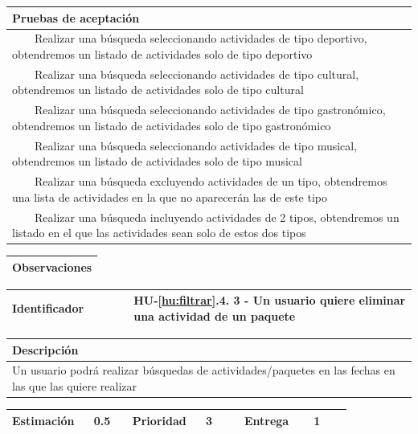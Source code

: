\documentclass[11pt]{article}
\newcommand{\tabitem}{~~\llap{\textbullet}~~}
\begin{document}
\begin{longtable}{p{1.028\linewidth}}
	\textbf{Pruebas de aceptación}\\
	\midrule
	\tabitem Realizar una búsqueda seleccionando actividades de tipo deportivo, obtendremos un listado de actividades solo de tipo deportivo\\
	\tabitem Realizar una búsqueda seleccionando actividades de tipo cultural, obtendremos un listado de actividades solo de tipo cultural\\
	\tabitem Realizar una búsqueda seleccionando actividades de tipo gastronómico, obtendremos un listado de actividades solo de tipo gastronómico\\
	\tabitem Realizar una búsqueda seleccionando actividades de tipo musical, obtendremos un listado de actividades solo de tipo musical\\
	\tabitem Realizar una búsqueda excluyendo actividades de un tipo, obtendremos una lista de actividades en la que no aparecerán las de este tipo\\
	\tabitem Realizar una búsqueda incluyendo actividades de 2 tipos, obtendremos un listado en el que las actividades sean solo de estos dos tipos\\
\end{longtable}
\begin{longtable}{p{1.028\linewidth}}
	\textbf{Observaciones}\\
	\midrule
	\bottomrule
	\bottomrule
\end{longtable}

\centering
\begin{longtable}{p{0.3\linewidth}|p{0.7\linewidth}}
	\toprule
	\toprule
	\textbf{Identificador} & \textbf{HU-\ref{hu:filtrar}.4}. 3 - Un usuario quiere eliminar una actividad de un paquete\\
	
	\bottomrule
\end{longtable}

\begin{longtable}{p{1.028\linewidth}}
	\textbf{Descripción}\\
	\midrule
	Un usuario podrá realizar búsquedas de actividades/paquetes en las fechas en las que las quiere realizar
\end{longtable}
\begin{longtable}{p{0.18\linewidth}|p{0.1\linewidth}|p{0.18\linewidth}|p{0.1\linewidth}|p{0.18\linewidth}|p{0.1\linewidth}}
	\toprule
	\textbf{Estimación} & 0.5 & \textbf{Prioridad} & 3 & \textbf{Entrega} & 1 \\
	\bottomrule
\end{longtable}
\end{document}
